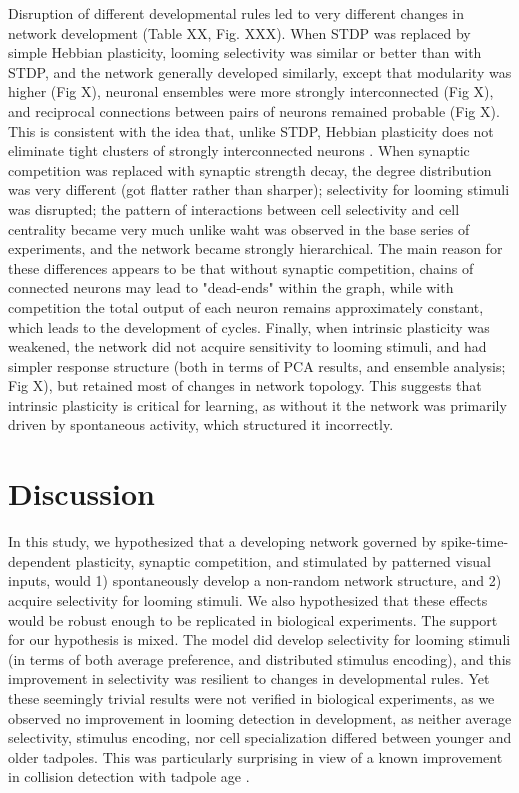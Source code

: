 \documentclass{article}
\begin{document}
Disruption of different developmental rules led to very different changes in network development (Table XX, Fig. XXX). When STDP was replaced by simple Hebbian plasticity, looming selectivity was similar or better than with STDP, and the network generally developed similarly, except that modularity was higher (Fig X), neuronal ensembles were more strongly interconnected (Fig X), and reciprocal connections between pairs of neurons remained probable (Fig X). This is consistent with the idea that, unlike STDP, Hebbian plasticity does not eliminate tight clusters of strongly interconnected neurons \citep{fiete2010chains}. When synaptic competition was replaced with synaptic strength decay, the degree distribution was very different (got flatter rather than sharper); selectivity for looming stimuli was disrupted; the pattern of interactions between cell selectivity and cell centrality became very much unlike waht was observed in the base series of experiments, and the network became strongly hierarchical. The main reason for these differences appears to be that without synaptic competition, chains of connected neurons may lead to "dead-ends" within the graph, while with competition the total output of each neuron remains approximately constant, which leads to the development of cycles. Finally, when intrinsic plasticity was weakened, the network did not acquire sensitivity to looming stimuli, and had simpler response structure (both in terms of PCA results, and ensemble analysis; Fig X), but retained most of changes in network topology. This suggests that intrinsic plasticity is critical for learning, as without it the network was primarily driven by spontaneous activity, which structured it incorrectly.

\section*{Discussion}

In this study, we hypothesized that a developing network governed by spike-time-dependent plasticity, synaptic competition, and stimulated by patterned visual inputs, would 1) spontaneously develop a non-random network structure, and 2) acquire selectivity for looming stimuli. We also hypothesized that these effects would be robust enough to be replicated in biological experiments. The support for our hypothesis is mixed. The model did develop selectivity for looming stimuli (in terms of both average preference, and distributed stimulus encoding), and this improvement in selectivity was resilient to changes in developmental rules. Yet these seemingly trivial results were not verified in biological experiments, as we observed no improvement in looming detection in development, as neither average selectivity, stimulus encoding, nor cell specialization differed between younger and older tadpoles. This was particularly surprising in view of a known improvement in collision detection with tadpole age \citep{dong2009}.
\end{document}
